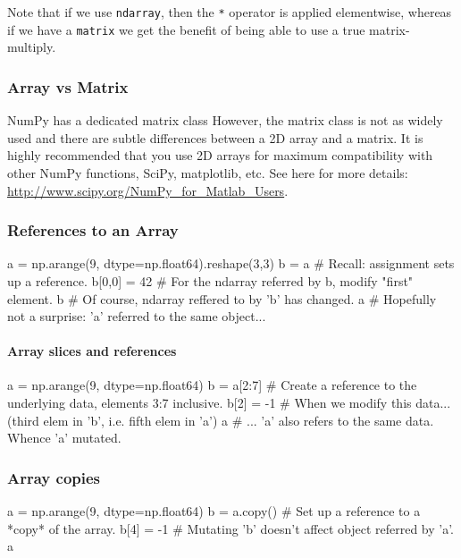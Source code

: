 \documentclass[12pt,letterpaper,twoside]{article}
\begin{document}
Note that if we use \texttt{ndarray}, then the \texttt{*} operator is
applied elementwise, whereas if we have a \texttt{matrix} we get the
benefit of being able to use a true matrix-multiply.

\subsubsection{Array vs Matrix}
NumPy has a dedicated matrix class
However, the matrix class is not as widely used and there are subtle
differences between a 2D array and a matrix.
It is highly recommended that you use 2D arrays for maximum
compatibility with other NumPy functions, SciPy, matplotlib, etc.
See here for more details:
\url{http://www.scipy.org/NumPy_for_Matlab_Users}.

\subsubsection{References to an Array}

\begin{python}
a = np.arange(9, dtype=np.float64).reshape(3,3)
b = a         # Recall: assignment sets up a reference.
b[0,0] = 42   # For the ndarray referred by b, modify "first" element.
b             # Of course, ndarray reffered to by 'b' has changed.
a             # Hopefully not a surprise: 'a' referred to the same object...
\end{python}

\paragraph{Array slices and references}

\begin{python}
a = np.arange(9, dtype=np.float64)
b = a[2:7]    # Create a reference to the underlying data, elements 3:7 inclusive.
b[2] = -1     # When we modify this data... (third elem in 'b', i.e. fifth elem in 'a')
a             # ... 'a' also refers to the same data. Whence 'a' mutated.
\end{python}

\hypertarget{array-copies}{%
\subsubsection{Array copies}\label{array-copies}}

\begin{python}
a = np.arange(9, dtype=np.float64)
b = a.copy()       # Set up a reference to a *copy* of the array.
b[4] = -1          # Mutating 'b' doesn't affect object referred by 'a'.
a
\end{python}
\end{document}
